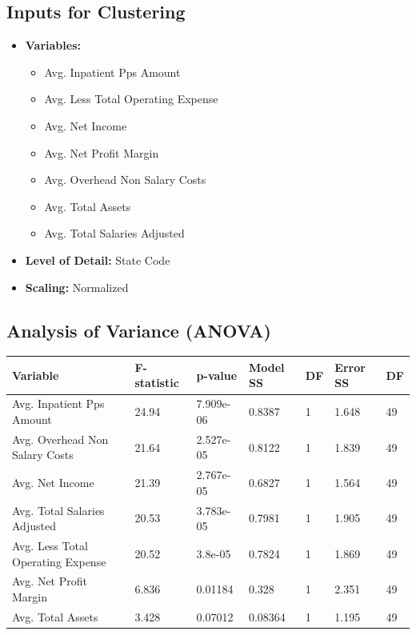 \documentclass{article}
\theoremstyle{mytheoremstyle}
\theoremstyle{mytheoremstyle}
\theoremstyle{myproblemstyle}
\begin{document}
\subsection*{Inputs for Clustering}
\begin{itemize}
    \item \textbf{Variables:}
    \begin{itemize}
        \item Avg. Inpatient Pps Amount
        \item Avg. Less Total Operating Expense
        \item Avg. Net Income
        \item Avg. Net Profit Margin
        \item Avg. Overhead Non Salary Costs
        \item Avg. Total Assets
        \item Avg. Total Salaries Adjusted
    \end{itemize}
    \item \textbf{Level of Detail:} State Code
    \item \textbf{Scaling:} Normalized
\end{itemize}


\subsection*{Analysis of Variance (ANOVA)}
\begin{tabular}{@{}lllllll@{}}
\toprule
\textbf{Variable} & \textbf{F-statistic} & \textbf{p-value} & \textbf{Model SS} & \textbf{DF} & \textbf{Error SS} & \textbf{DF} \\
\midrule
Avg. Inpatient Pps Amount & 24.94 & 7.909e-06 & 0.8387 & 1 & 1.648 & 49 \\
Avg. Overhead Non Salary Costs & 21.64 & 2.527e-05 & 0.8122 & 1 & 1.839 & 49 \\
Avg. Net Income & 21.39 & 2.767e-05 & 0.6827 & 1 & 1.564 & 49 \\
Avg. Total Salaries Adjusted & 20.53 & 3.783e-05 & 0.7981 & 1 & 1.905 & 49 \\
Avg. Less Total Operating Expense & 20.52 & 3.8e-05 & 0.7824 & 1 & 1.869 & 49 \\
Avg. Net Profit Margin & 6.836 & 0.01184 & 0.328 & 1 & 2.351 & 49 \\
Avg. Total Assets & 3.428 & 0.07012 & 0.08364 & 1 & 1.195 & 49 \\
\bottomrule
\end{tabular}
\end{document}
